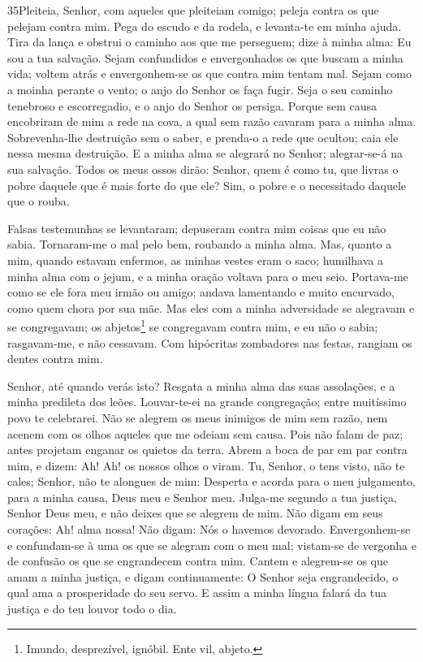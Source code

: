 \bigskip

\lettrine{35}{}Pleiteia, Senhor, com aqueles que pleiteiam
comigo; peleja contra os que pelejam contra mim. Pega do escudo
e da rodela, e levanta-te em minha ajuda. Tira da lança e
obstrui o caminho aos que me perseguem; dize à minha alma: Eu sou a
tua salvação. Sejam confundidos e envergonhados os que buscam a
minha vida; voltem atrás e envergonhem-se os que contra mim tentam
mal. Sejam como a moinha perante o vento; o anjo do Senhor os
faça fugir. Seja o seu caminho tenebroso e escorregadio, e o
anjo do Senhor os persiga. Porque sem causa encobriram de mim a
rede na cova, a qual sem razão cavaram para a minha alma.
Sobrevenha-lhe destruição sem o saber, e prenda-o a rede que
ocultou; caia ele nessa mesma destruição. E a minha alma se
alegrará no Senhor; alegrar-se-á na sua salvação. Todos os
meus ossos dirão: Senhor, quem é como tu, que livras o pobre daquele
que é mais forte do que ele? Sim, o pobre e o necessitado daquele
que o rouba.

Falsas testemunhas se levantaram; depuseram contra mim coisas que
eu não sabia. Tornaram-me o mal pelo bem, roubando a minha
alma. Mas, quanto a mim, quando estavam enfermos, as minhas
vestes eram o saco; humilhava a minha alma com o jejum, e a minha
oração voltava para o meu seio. Portava-me como se ele fora
meu irmão ou amigo; andava lamentando e muito encurvado, como quem
chora por sua mãe. Mas eles com a minha adversidade se
alegravam e se congregavam; os abjetos\footnote{Imundo, desprezível,
ignóbil. Ente vil, abjeto.} se congregavam contra mim, e eu não o
sabia; rasgavam-me, e não cessavam. Com hipócritas zombadores
nas festas, rangiam os dentes contra mim.

Senhor, até quando verás isto? Resgata a minha alma das suas
assolações, e a minha predileta dos leões. Louvar-te-ei na
grande congregação; entre muitíssimo povo te celebrarei. Não
se alegrem os meus inimigos de mim sem razão, nem acenem com os
olhos aqueles que me odeiam sem causa. Pois não falam de paz;
antes projetam enganar os quietos da terra. Abrem a boca de
par em par contra mim, e dizem: Ah! Ah! os nossos olhos o viram.
Tu, Senhor, o tens visto, não te cales; Senhor, não te
alongues de mim: Desperta e acorda para o meu julgamento,
para a minha causa, Deus meu e Senhor meu. Julga-me segundo a
tua justiça, Senhor Deus meu, e não deixes que se alegrem de mim.
Não digam em seus corações: Ah! alma nossa! Não digam: Nós o
havemos devorado. Envergonhem-se e confundam-se à uma os que
se alegram com o meu mal; vistam-se de vergonha e de confusão os que
se engrandecem contra mim. Cantem e alegrem-se os que amam a
minha justiça, e digam continuamente: O Senhor seja engrandecido, o
qual ama a prosperidade do seu servo. E assim a minha língua
falará da tua justiça e do teu louvor todo o dia.

